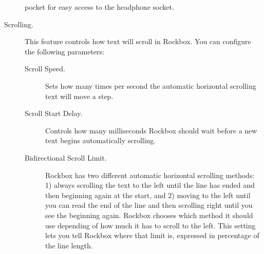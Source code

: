 \begin{description}
{\begin{description}
         pocket for easy access to the headphone socket.
    \end{description}
  }
%
  \item[Scrolling.]
    This feature controls how text will scroll in Rockbox. You can configure
    the following parameters:
    \begin{description}
    \item[Scroll Speed.]
      Sets how many times per second the automatic horizontal scrolling text 
      will move a step.
    \item[Scroll Start Delay.]
      Controls how many milliseconds Rockbox should wait before a new
      text begins automatically scrolling.
    \item[Bidirectional Scroll Limit.]
      Rockbox has two different automatic horizontal scrolling methods: 1) always
      scrolling the text to the left until the line has ended and then beginning
      again at the start, and 2) moving to the left until you can read the end of
      the line and then scrolling right until you see the beginning again.
      Rockbox chooses which method it should use depending of how much it has to
      scroll to the left. This setting lets you tell Rockbox where that limit
      is, expressed in percentage of the line length.
\end{description}
\end{description}
